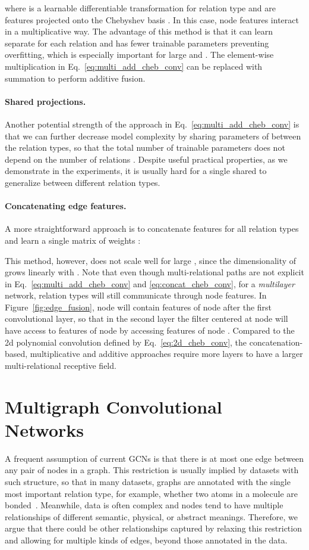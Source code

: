 \documentclass[final,nonatbib]{article} \usepackage{nips_2018}
\begin{document}
	where  is a learnable differentiable transformation for relation type  and  are features projected onto the Chebyshev basis .
	In this case, node features interact in a multiplicative way. The advantage of this method is that it can learn separate  for each relation and has fewer trainable parameters preventing overfitting, which is especially important for large  and .
	The element-wise multiplication  in Eq.~\ref{eq:multi_add_cheb_conv} can be replaced with summation to perform additive fusion.

	 \paragraph{Shared projections.}
	 Another potential strength of the approach in Eq.~\ref{eq:multi_add_cheb_conv} is that we can further decrease model complexity by sharing parameters of  between the relation types, so that the total number of trainable parameters does not depend on the number of relations . Despite useful practical properties, as we demonstrate in the experiments, it is usually hard for a single shared  to generalize between different relation types.

	\paragraph{Concatenating edge features.} A more straightforward approach is to concatenate features  for all  relation types and learn a single matrix of weights :

This method, however, does not scale well for large , since the dimensionality of  grows linearly with . Note that even though multi-relational paths are not explicit in Eq.~\ref{eq:multi_add_cheb_conv} and \ref{eq:concat_cheb_conv}, for a \textit{multilayer} network, relation types will still communicate through node features. In Figure~\ref{fig:edge_fusion}, node  will contain features of node  after the first convolutional layer, so that in the second layer the filter centered at node  will have access to features of node  by accessing features of node . Compared to the 2d polynomial convolution defined by Eq.~\ref{eq:2d_cheb_conv}, the concatenation-based, multiplicative and additive approaches require more layers to have a larger multi-relational receptive field.


	\section{Multigraph Convolutional Networks}
	\label{sec:model}
	A frequent assumption of current GCNs is that there is at most one edge between any pair of nodes in a graph. This restriction is usually implied by datasets with such structure, so that in
	many datasets, graphs are annotated with the single most important relation type, for example, whether two atoms in a molecule are bonded~\cite{wale2008comparison, duvenaud2015convolutional}. Meanwhile, data is often complex and nodes tend to have multiple relationships of different semantic, physical, or abstract meanings. Therefore, we argue that there could be other relationships captured by relaxing this restriction and allowing for multiple kinds of edges, beyond those annotated in the data.
\end{document}
